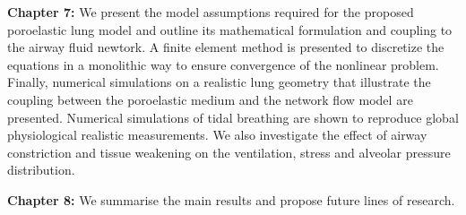 \noindent \textbf{Chapter 7:} We present the model assumptions required for the proposed poroelastic lung model and outline its mathematical formulation and coupling to the airway fluid newtork. A finite element method is presented to discretize the equations in a monolithic way to ensure convergence of the nonlinear problem. Finally, numerical simulations on a realistic lung geometry that illustrate the coupling between the poroelastic medium and the network flow model are presented. Numerical simulations of tidal breathing are shown to reproduce global physiological realistic measurements. We also investigate the effect of airway constriction and tissue weakening on the ventilation, stress and alveolar pressure distribution.
\newline

\noindent \textbf{Chapter 8:} We summarise the main results and propose future lines of research.
\newline



 
 


